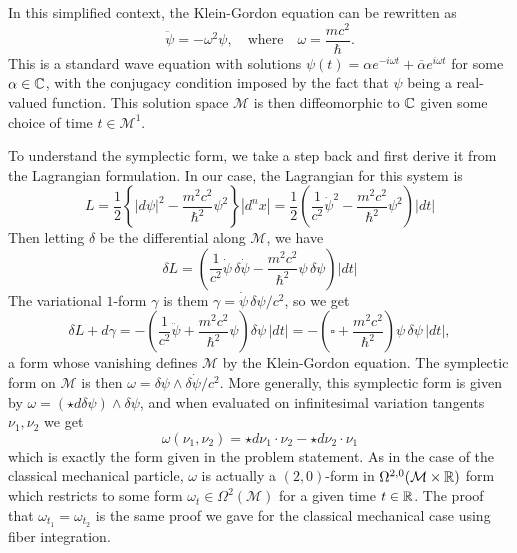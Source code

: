 \documentclass{pset}
\begin{document}
\begin{solution}
  In this simplified context, the Klein-Gordon equation can be rewritten as
  \[
    \ddot{\psi} = -\omega^2 \psi,\quad \textrm{where}\quad \omega=\frac{mc^2}{\hbar}.
  \]
  This is a standard wave equation with solutions $\psi(t) = \alpha e^{-i\omega t} + \overline{\alpha} e^{i\omega t}$ for some $\alpha \in \mathbb{C}$, with the conjugacy condition imposed by the fact that $\psi$ being a real-valued function. This solution space $\mathcal{M}$ is then diffeomorphic to $\mathbb{C}$ given some choice of time $t\in \mathcal{M}^1$.

  To understand the symplectic form, we take a step back and first derive it from the Lagrangian formulation. In our case, the Lagrangian for this system is 
  \[
    L = \frac{1}{2}\left\{|d\psi|^2 - \frac{m^2 c^2}{\hbar^2}\psi^2\right\}|d^n x| = \frac{1}{2}\left(\frac{1}{c^2}\dot{\psi}^2 - \frac{m^2 c^2}{\hbar^2}\psi^2\right) |dt|
  \]
  Then letting $\delta$ be the differential along $\mathcal{M}$, we have
  \[
    \delta L = \left(\frac{1}{c^2}\dot{\psi}\,\delta \dot{\psi} - \frac{m^2 c^2}{\hbar^2}\psi\,\delta\psi\right) |dt|
  \]
  The variational $1$-form $\gamma$ is them $\gamma = \dot{\psi}\,\delta\psi/c^2$, so we get
  \[
    \delta L + d\gamma = -\left(\frac{1}{c^2}\ddot{\psi} + \frac{m^2 c^2}{\hbar^2}\psi\right) \delta\psi\, |dt| = -\left(\square + \frac{m^2 c^2}{\hbar^2}\right)\psi\, \delta\psi\,|dt|,
  \]
  a form whose vanishing defines $\mathcal{M}$ by the Klein-Gordon equation. The symplectic form on $\mathcal{M}$ is then $\omega = \delta\psi\wedge \delta\dot{\psi}/c^2$. More generally, this symplectic form is given by $\omega = (\star d\delta \psi)\wedge \delta\psi$, and when evaluated on infinitesimal variation tangents $\nu_1,\nu_2$ we get
  \[
    \omega(\nu_1, \nu_2) = \star d\nu_1 \cdot \nu_2 - \star d\nu_2 \cdot \nu_1
  \]
  which is exactly the form given in the problem statement. As in the case of the classical mechanical particle, $\omega$ is actually a $(2,0)$-form in $\Omega^{2,0}(\mathcal{M}\times \mathbb{R})$ form which restricts to some form $\omega_t \in \Omega^2(\mathcal{M})$ for a given time $t\in \mathbb{R}$. The proof that $\omega_{t_1} = \omega_{t_2}$ is the same proof we gave for the classical mechanical case using fiber integration.


\end{solution}
\end{document}
